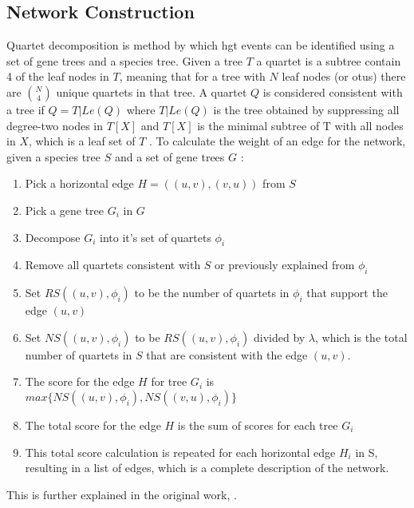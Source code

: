 \subsection{Network Construction}
Quartet decomposition is method by which \ac{hgt} events can be identified using a set of gene trees and a species tree.
Given a tree $T$ a quartet is a subtree contain 4 of the leaf nodes in $T$, meaning that for a tree with $N$ leaf nodes (or \ac{otu}s) there are $\binom{N}{4}$ unique quartets in that tree.
A quartet $Q$ is considered consistent with a tree if $Q = T|Le(Q)$ where $T|Le(Q)$ is the tree obtained by suppressing all degree-two nodes in $T[X]$ and $T[X]$ is the minimal subtree of T with all nodes in $X$, which is a leaf set of $T$ \citep{hide}.
To calculate the weight of an edge for the network, given a species tree $S$ and a set of gene trees $G$ \citep{hide}:
\begin{enumerate}
    \item Pick a horizontal edge $H = ((u,v),(v,u))$ from $S$
    \item Pick a gene tree $G_i$ in $G$
    \item Decompose $G_i$ into it's set of quartets $\phi_i$
    \item Remove all quartets consistent with $S$ or previously explained from $\phi_i$
    \item Set $RS((u,v),\phi_i)$ to be the number of quartets in $\phi_i$ that support the edge $(u,v)$
    \item Set $NS((u,v),\phi_i)$ to be $RS((u,v),\phi_i)$ divided by $\lambda$, which is the total number of quartets in $S$ that are consistent with the edge $(u,v)$.
    \item The score for the edge $H$ for tree $G_i$ is $max\{NS((u,v),\phi_i),NS((v,u),\phi_i)\}$
    \item The total score for the edge $H$ is the sum of scores for each tree $G_i$
    \item This total score calculation is repeated for each horizontal edge $H_i$ in S, resulting in a list of edges, which is a complete description of the network.
\end{enumerate}
This is further explained in the original work, \citep{hide}.
